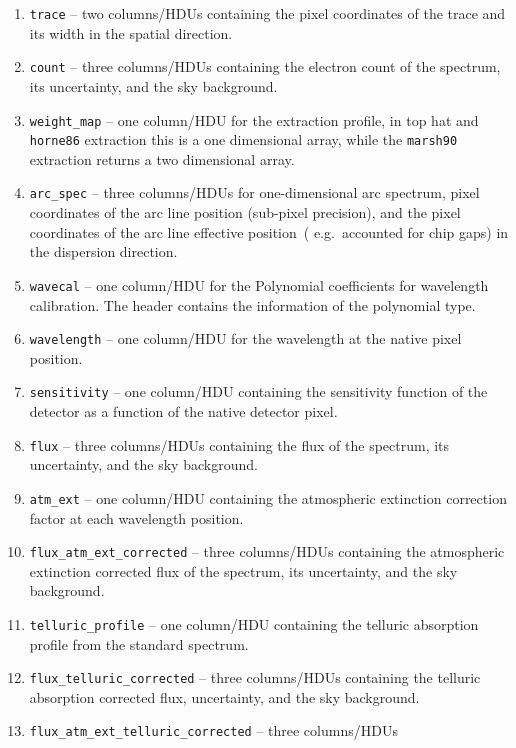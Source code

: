 \documentclass[linenumbers, twocolumn]{aastex631}
\begin{document}
\begin{enumerate}
    \item \texttt{trace} -- two columns/HDUs containing the pixel coordinates
    of the trace and its width in the spatial direction.
    \item \texttt{count} -- three columns/HDUs containing the electron count
    of the spectrum, its uncertainty, and the sky background.
    \item \texttt{weight\_map} -- one column/HDU for the extraction profile,
    in top hat and \texttt{horne86} extraction this is a one dimensional array,
    while the \texttt{marsh90} extraction returns a two dimensional array.
    \item \texttt{arc\_spec} -- three columns/HDUs for one-dimensional arc
    spectrum, pixel coordinates of the arc line position (sub-pixel precision),
    and the pixel coordinates of the arc line effective position~(
    e.g.\ accounted for chip gaps) in the dispersion direction.
    \item \texttt{wavecal} -- one column/HDU for the Polynomial coefficients
    for wavelength calibration. The header contains the information of the
    polynomial type.
    \item \texttt{wavelength} -- one column/HDU for the wavelength at the
    native pixel position.
    \item \texttt{sensitivity} -- one column/HDU containing the sensitivity
    function of the detector as a function of the native detector pixel.
    \item \texttt{flux} -- three columns/HDUs containing the
    flux of the spectrum, its uncertainty, and the sky background.
    \item \texttt{atm\_ext} -- one column/HDU containing the atmospheric
    extinction correction factor at each wavelength position.
    \item \texttt{flux\_atm\_ext\_corrected} -- three columns/HDUs containing
    the atmospheric extinction corrected flux of the spectrum, its
    uncertainty, and the sky background.
    \item \texttt{telluric\_profile} -- one column/HDU containing the telluric
    absorption profile from the standard spectrum.
    \item \texttt{flux\_telluric\_corrected} -- three columns/HDUs containing
    the telluric absorption corrected flux, uncertainty, and the sky
    background.
    \item \texttt{flux\_atm\_ext\_telluric\_corrected} -- three columns/HDUs

\end{enumerate}
\end{document}
